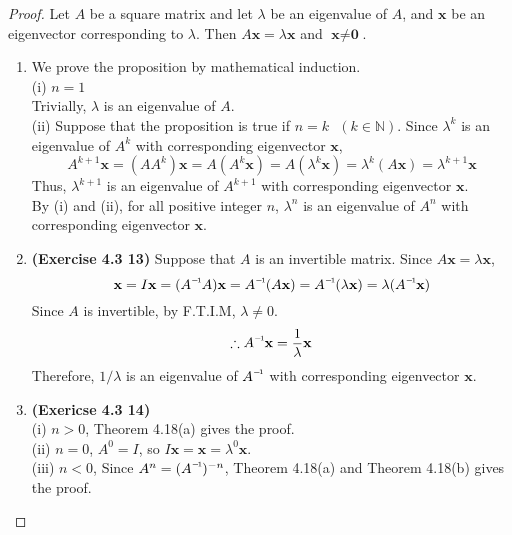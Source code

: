 \begin{proof}
	Let $A$ be a square matrix and let $\lambda$ be an eigenvalue of $A$, and $\textbf{x}$ be an eigenvector corresponding to $\lambda$. Then $A\textbf{x} = \lambda\textbf{x}$ and $\textbf{x} \neq \textbf{0}$.
	\begin{enumerate}
		\item We prove the proposition by mathematical induction. \\
		
		(i) $n = 1$ \\
		Trivially, $\lambda$ is an eigenvalue of $A$. \\
		
		(ii) Suppose that the proposition is true if $n = k \mbox{ } (k \in \mathbb{N})$. Since $\lambda^{k}$ is an eigenvalue of $A^{k}$ with corresponding eigenvector $\textbf{x}$, \begin{equation*}
			A^{k+1}\textbf{x} = (AA^{k})\textbf{x} = A(A^{k}\textbf{x}) = A(\lambda^{k}\textbf{x}) = \lambda^{k}(A\textbf{x}) = \lambda^{k+1}\textbf{x}
		\end{equation*}
		Thus, $\lambda^{k+1}$ is an eigenvalue of $A^{k+1}$ with corresponding eigenvector $\textbf{x}$. \\
		
		By (i) and (ii), for all positive integer $n$, $\lambda^n$ is an eigenvalue of $A^n$ with corresponding eigenvector $\textbf{x}$.
		
		\item\textbf{(Exercise 4.3 13)} Suppose that $A$ is an invertible matrix. Since $A\textbf{x} = \lambda\textbf{x}$, \begin{equation*}
			\textbf{x} = I\textbf{x} = (\inv{A}A)\textbf{x} = \inv{A}(A\textbf{x}) = \inv{A}(\lambda\textbf{x}) = \lambda(\inv{A}\textbf{x})
		\end{equation*} 
		Since $A$ is invertible, by F.T.I.M, $\lambda \neq 0$. \begin{equation*}
			\therefore \inv{A}\textbf{x} = \frac{1}{\lambda}\textbf{x}
		\end{equation*}
		Therefore, $1/\lambda$ is an eigenvalue of $\inv{A}$ with corresponding eigenvector $\textbf{x}$.
		
		\item \textbf{(Exericse 4.3 14)} \\
		(i) $n > 0$, Theorem 4.18(a) gives the proof. \\
		(ii) $n = 0$, $A^0 = I$, so $I\textbf{x} = \textbf{x} = \lambda^0\textbf{x}$. \\
		(iii) $n < 0$, Since $A^n = (\inv{A})^{-n}$, Theorem 4.18(a) and Theorem 4.18(b) gives the proof.
	\end{enumerate}
\end{proof}

